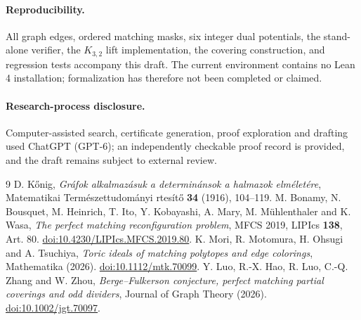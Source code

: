 \documentclass[11pt]{article}
\begin{document}
\paragraph{Reproducibility.} All graph edges, ordered matching masks,
six integer dual potentials, the stand-alone verifier, the
$K_{3,2}$ lift implementation, the covering construction, and
regression tests accompany this draft. The current environment
contains no Lean 4 installation; formalization has therefore
not been completed or claimed.

\paragraph{Research-process disclosure.} Computer-assisted search,
certificate generation, proof exploration and drafting used
ChatGPT (GPT-6); an independently checkable proof record is
provided, and the draft remains subject to external review.

\begin{thebibliography}{9}
 D. K\H onig, \emph{Gr\'afok  alkalmaz\'asuk a determin\'ansok  a halmazok elm\'elet\'ere},
Matematikai  Term\'eszettudom\'anyi rtes\'it\H o \textbf{34} (1916), 104--119.
 M. Bonamy, N. Bousquet, M. Heinrich,
T. Ito, Y. Kobayashi, A. Mary, M. M\"uhlenthaler and K. Wasa,
\emph{The perfect matching reconfiguration problem},
MFCS 2019, LIPIcs \textbf{138}, Art. 80.
\href{https://doi.org/10.4230/LIPIcs.MFCS.2019.80}{doi:10.4230/LIPIcs.MFCS.2019.80}.
 K. Mori, R. Motomura, H. Ohsugi and A. Tsuchiya,
\emph{Toric ideals of matching polytopes and edge colorings},
Mathematika (2026).
\href{https://doi.org/10.1112/mtk.70099}{doi:10.1112/mtk.70099}.
 Y. Luo, R.-X. Hao, R. Luo, C.-Q. Zhang and W. Zhou,
\emph{Berge--Fulkerson conjecture, perfect matching partial coverings and odd dividers},
Journal of Graph Theory (2026).
\href{https://doi.org/10.1002/jgt.70097}{doi:10.1002/jgt.70097}.
\end{thebibliography}
\end{document}
